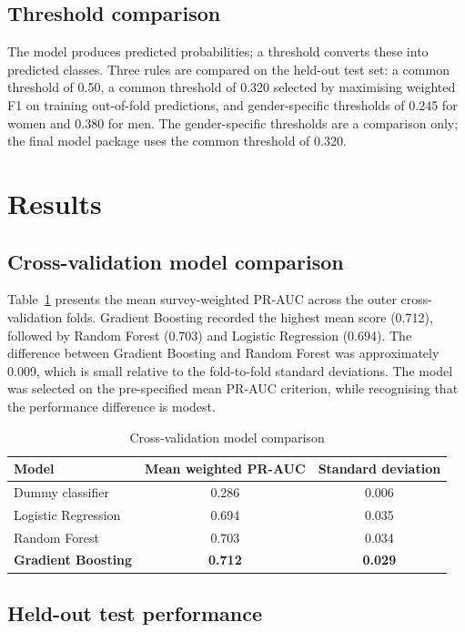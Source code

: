 \documentclass[11pt,a4paper]{article}
\begin{document}
\subsection{Threshold comparison}

The model produces predicted probabilities; a threshold converts these into predicted classes. Three rules are compared on the held-out test set: a common threshold of 0.50, a common threshold of 0.320 selected by maximising weighted F1 on training out-of-fold predictions, and gender-specific thresholds of 0.245 for women and 0.380 for men. The gender-specific thresholds are a comparison only; the final model package uses the common threshold of 0.320.

\section{Results}

\subsection{Cross-validation model comparison}

Table~\ref{tab:cv} presents the mean survey-weighted PR-AUC across the outer cross-validation folds. Gradient Boosting recorded the highest mean score (0.712), followed by Random Forest (0.703) and Logistic Regression (0.694). The difference between Gradient Boosting and Random Forest was approximately 0.009, which is small relative to the fold-to-fold standard deviations. The model was selected on the pre-specified mean PR-AUC criterion, while recognising that the performance difference is modest.

\begin{table}[H]
\centering
\caption{Cross-validation model comparison}
\label{tab:cv}
\begin{tabular}{lcc}
\toprule
Model & Mean weighted PR-AUC & Standard deviation\\
\midrule
Dummy classifier & 0.286 & 0.006\\
Logistic Regression & 0.694 & 0.035\\
Random Forest & 0.703 & 0.034\\
\textbf{Gradient Boosting} & \textbf{0.712} & \textbf{0.029}\\
\bottomrule
\end{tabular}
\end{table}

\subsection{Held-out test performance}
\end{document}
